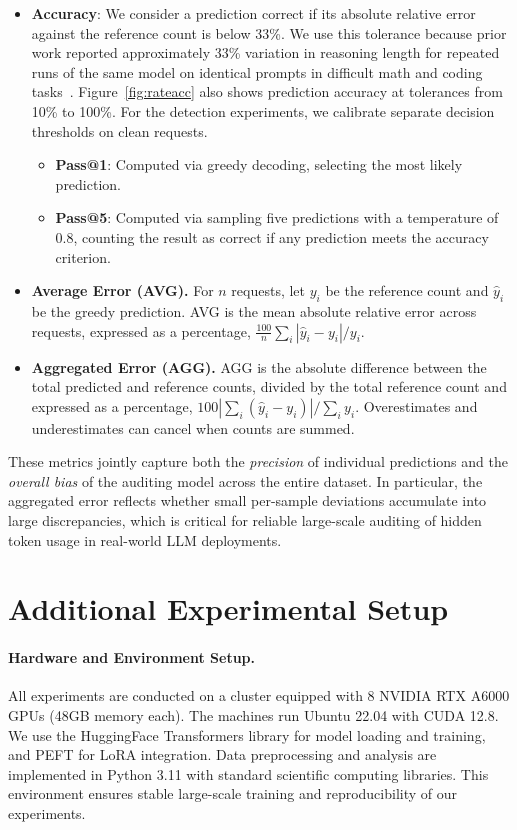 \documentclass[pdflatex,sn-mathphys-num]{sn-jnl}%
\theoremstyle{thmstyleone}%
\theoremstyle{thmstyletwo}%
\theoremstyle{thmstylethree}%
\begin{document}
\begin{itemize}
\item \textbf{Accuracy}: We consider a prediction correct if its absolute relative error against the reference count is below 33\%. We use this tolerance because prior work reported approximately 33\% variation in reasoning length for repeated runs of the same model on identical prompts in difficult math and coding tasks~\citep{sun2025invisible}. Figure~\ref{fig:rateacc} also shows prediction accuracy at tolerances from 10\% to 100\%. For the detection experiments, we calibrate separate decision thresholds on clean requests.

\begin{itemize}
\item \textbf{Pass@1}: Computed via greedy decoding, selecting the most likely prediction.
\item \textbf{Pass@5}: Computed via sampling five predictions with a temperature of 0.8, counting the result as correct if any prediction meets the accuracy criterion.
\end{itemize}
\item \textbf{Average Error (AVG).} For \(n\) requests, let \(y_i\) be the reference count and \(\hat y_i\) be the greedy prediction. AVG is the mean absolute relative error across requests, expressed as a percentage, \(\frac{100}{n}\sum_i |\hat y_i-y_i|/y_i\).
\item \textbf{Aggregated Error (AGG).} AGG is the absolute difference between the total predicted and reference counts, divided by the total reference count and expressed as a percentage, \(100|\sum_i(\hat y_i-y_i)|/\sum_i y_i\). Overestimates and underestimates can cancel when counts are summed.
\end{itemize}
These metrics jointly capture both the \textit{precision} of individual predictions and the \textit{overall bias} of the auditing model across the entire dataset. In particular, the aggregated error reflects whether small per-sample deviations accumulate into large discrepancies, which is critical for reliable large-scale auditing of hidden token usage in real-world LLM deployments.

\section{Additional Experimental Setup}
\paragraph{Hardware and Environment Setup.}
All experiments are conducted on a cluster equipped with 8 NVIDIA RTX A6000 GPUs (48GB memory each). 
The machines run Ubuntu 22.04 with CUDA 12.8.
We use the HuggingFace Transformers library for model loading and training, and PEFT for LoRA integration. 
Data preprocessing and analysis are implemented in Python 3.11 with standard scientific computing libraries. 
This environment ensures stable large-scale training and reproducibility of our experiments.
\end{document}
